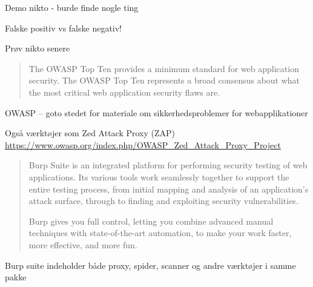 \documentclass[Screen16to9,17pt]{foils}
\begin{document}
\begin{list1}
\item Demo nikto - burde finde nogle ting
\item Falske positiv vs falske negativ!
\item Prøv nikto senere
\end{list1}




\begin{quote}
The OWASP Top Ten provides a minimum standard for web application
security. The OWASP Top Ten represents a broad consensus about what
the most critical web application security flaws are.
\end{quote}

\begin{list1}
\item OWASP -- goto stedet for materiale om  sikkerhedsproblemer for webapplikationer
\item {}
\item Også værktøjer som Zed Attack Proxy (ZAP)\\
 \url{https://www.owasp.org/index.php/OWASP_Zed_Attack_Proxy_Project}
\end{list1}


\begin{quote}
Burp Suite is an integrated platform for performing security testing of web applications. Its various tools work seamlessly together to support the entire testing process, from initial mapping and analysis of an application's attack surface, through to finding and exploiting security vulnerabilities.

Burp gives you full control, letting you combine advanced manual techniques with state-of-the-art automation, to make your work faster, more effective, and more fun.
\end{quote}

Burp suite indeholder både proxy, spider, scanner og andre værktøjer i samme pakke

\\



\end{document}

